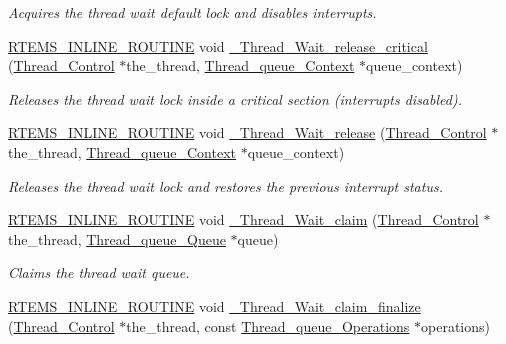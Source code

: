 \begin{DoxyCompactItemize}
\begin{DoxyCompactList}\small\item\em Acquires the thread wait default lock and disables interrupts. \end{DoxyCompactList}\item 
\mbox{\hyperlink{group__RTEMSScoreBaseDefs_gac216239df231d5dbd15e3520b0b9313f}{R\+T\+E\+M\+S\+\_\+\+I\+N\+L\+I\+N\+E\+\_\+\+R\+O\+U\+T\+I\+NE}} void \mbox{\hyperlink{group__RTEMSScoreThread_gae077609cfcf4bf7a741a5fd36020dcb4}{\+\_\+\+Thread\+\_\+\+Wait\+\_\+release\+\_\+critical}} (\mbox{\hyperlink{struct__Thread__Control}{Thread\+\_\+\+Control}} $\ast$the\+\_\+thread, \mbox{\hyperlink{structThread__queue__Context}{Thread\+\_\+queue\+\_\+\+Context}} $\ast$queue\+\_\+context)
\begin{DoxyCompactList}\small\item\em Releases the thread wait lock inside a critical section (interrupts disabled). \end{DoxyCompactList}\item 
\mbox{\hyperlink{group__RTEMSScoreBaseDefs_gac216239df231d5dbd15e3520b0b9313f}{R\+T\+E\+M\+S\+\_\+\+I\+N\+L\+I\+N\+E\+\_\+\+R\+O\+U\+T\+I\+NE}} void \mbox{\hyperlink{group__RTEMSScoreThread_gacb857fbbdbd059ae8e1f6fca8768da96}{\+\_\+\+Thread\+\_\+\+Wait\+\_\+release}} (\mbox{\hyperlink{struct__Thread__Control}{Thread\+\_\+\+Control}} $\ast$the\+\_\+thread, \mbox{\hyperlink{structThread__queue__Context}{Thread\+\_\+queue\+\_\+\+Context}} $\ast$queue\+\_\+context)
\begin{DoxyCompactList}\small\item\em Releases the thread wait lock and restores the previous interrupt status. \end{DoxyCompactList}\item 
\mbox{\hyperlink{group__RTEMSScoreBaseDefs_gac216239df231d5dbd15e3520b0b9313f}{R\+T\+E\+M\+S\+\_\+\+I\+N\+L\+I\+N\+E\+\_\+\+R\+O\+U\+T\+I\+NE}} void \mbox{\hyperlink{group__RTEMSScoreThread_ga032320598e809cb93d80e985906fb393}{\+\_\+\+Thread\+\_\+\+Wait\+\_\+claim}} (\mbox{\hyperlink{struct__Thread__Control}{Thread\+\_\+\+Control}} $\ast$the\+\_\+thread, \mbox{\hyperlink{structThread__queue__Queue}{Thread\+\_\+queue\+\_\+\+Queue}} $\ast$queue)
\begin{DoxyCompactList}\small\item\em Claims the thread wait queue. \end{DoxyCompactList}\item 
\mbox{\hyperlink{group__RTEMSScoreBaseDefs_gac216239df231d5dbd15e3520b0b9313f}{R\+T\+E\+M\+S\+\_\+\+I\+N\+L\+I\+N\+E\+\_\+\+R\+O\+U\+T\+I\+NE}} void \mbox{\hyperlink{group__RTEMSScoreThread_gadd97f74b63bbcfb524464371b06df50a}{\+\_\+\+Thread\+\_\+\+Wait\+\_\+claim\+\_\+finalize}} (\mbox{\hyperlink{struct__Thread__Control}{Thread\+\_\+\+Control}} $\ast$the\+\_\+thread, const \mbox{\hyperlink{structThread__queue__Operations}{Thread\+\_\+queue\+\_\+\+Operations}} $\ast$operations)

\end{DoxyCompactItemize}
